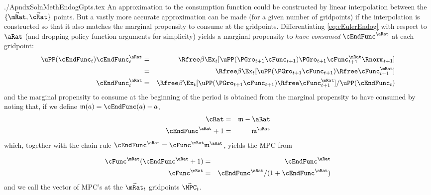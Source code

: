 \documentclass{econtex}
\begin{document}
\begin{verbatimwrite}{./ApndxSolnMethEndogGpts.tex}
An approximation to the consumption function could be constructed by
linear interpolation between the $\{\vec{\mRat},\vec{\cRat}\}$ points.
But a vastly more accurate approximation can be made (for a given
number of gridpoints) if the interpolation is constructed so that it
also matches the marginal propensity to consume at the gridpoints. Differentiating \eqref{eq:cEulerEndog}
with respect to $\aRat$ (and dropping policy function arguments for
simplicity) yields a marginal propensity to {\it have consumed} $\cEndFunc^{\aRat}$ at
each gridpoint:
\begin{eqnarray}
\uPP(\cEndFunc_{t})\cEndFunc_{t}^{\aRat} & = & \Rfree \beta \Ex_{t}[\uPP(\PGro_{t+1} \cFunc_{t+1})\PGro_{t+1} \cFunc^{\mRat}_{t+1}\Rnorm_{t+1}] \notag
\\ & = & \Rfree \beta \Ex_{t}[\uPP(\PGro_{t+1} \cFunc_{t+1}) \Rfree \cFunc^{\mRat}_{t+1}] \notag
\\ \cEndFunc_{t}^{\aRat} & = & \Rfree \beta \Ex_{t}[\uPP(\PGro_{t+1}  \cFunc_{t+1}) \Rfree \cFunc^{\mRat}_{t+1}]/\uPP(\cEndFunc_{t}) \label{eq:MPTHC}
\end{eqnarray}
and the marginal propensity to consume at the beginning of the period is obtained from the marginal
propensity to have consumed by noting that, if we define $\mathfrak{m}(a) = \cEndFunc(a)-a$,
\begin{eqnarray*}
   \cRat & = & \mathfrak{m}-\aRat
\\ \cEndFunc^{\aRat}+1 & = & \mathfrak{m}^{\aRat}
\end{eqnarray*}
which, together with the chain rule $\cEndFunc^{\aRat}  = \cFunc^{\mRat}\mathfrak{m}^{\aRat}$,
yields the MPC from

\begin{eqnarray*}
   \cFunc^{\mRat}(\cEndFunc^{\aRat}+1) & = & \cEndFunc^{\aRat}
\\ \cFunc^{\mRat} & = & \cEndFunc^{\aRat}/(1+\cEndFunc^{\aRat}) \label{eq:MPCfromMPTHC}
\end{eqnarray*}
and we call the vector of MPC's at the $\vec{\mRat}_{t}$ gridpoints $\vec{\MPC}_{t}$.

\begin{comment}

Standard polynomial interpolation methods can then be used to
construct a function that matches the level and first derivative at a
set of points; the actual solution code uses the built-in
interpolation tools of {\it Mathematica} for this purpose.

With the level and derivative of the consumption function defined at a discrete set of gridpoints,
it is possible to construct an interpolating function that is a highly accurate approximation to
the true consumption function within the grid.  But if any such interpolation is extended beyond the
boundaries defined by the minimum and maximum gridpoints, it is sure to go badly astray.


\end{comment}
\end{verbatimwrite}
\end{document}
